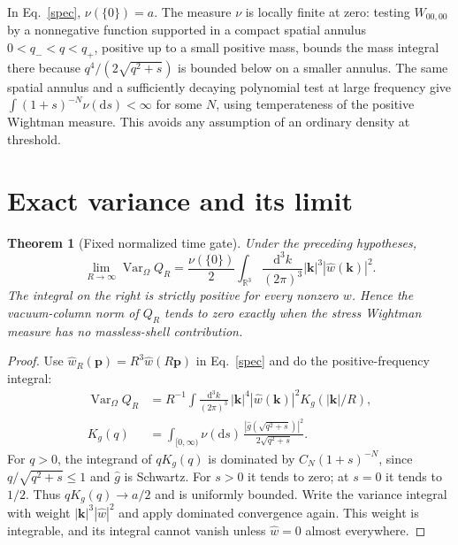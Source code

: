 \documentclass[11pt]{article}
\newtheorem{theorem}{Theorem}\newtheorem{lemma}[theorem]{Lemma}
\newcommand{\dd}{\mathrm d}
\newcommand{\Var}{\operatorname{Var}}
\newcommand{\pn}{\boldsymbol p}
\newcommand{\kn}{\boldsymbol k}
\begin{document}
In Eq.~\eqref{spec}, \(\nu(\{0\})=a\). The measure \(\nu\) is locally finite at zero: testing \(W_{00,00}\) by a nonnegative function supported in a compact spatial annulus \(0<q_-<q<q_+\), positive up to a small positive mass, bounds the mass integral there because \(q^4/(2\sqrt{q^2+s})\) is bounded below on a smaller annulus. The same spatial annulus and a sufficiently decaying polynomial test at large frequency give \(\int (1+s)^{-N}\nu(\dd s)<\infty\) for some \(N\), using temperateness of the positive Wightman measure. This avoids any assumption of an ordinary density at threshold.

\section{Exact variance and its limit}
\begin{theorem}[Fixed normalized time gate]\label{thm}
Under the preceding hypotheses,
\begin{equation}
 \lim_{R\to\infty}\Var_\Omega Q_R
  =\frac{\nu(\{0\})}{2}\int_{\mathbb R^3}\frac{\dd^3k}{(2\pi)^3}
                           |\kn|^3|\widehat w(\kn)|^2.
 \label{limit}
\end{equation}
The integral on the right is strictly positive for every nonzero \(w\). Hence the vacuum-column norm of \(Q_R\) tends to zero exactly when the stress Wightman measure has no massless-shell contribution.
\end{theorem}
\begin{proof}
Use \(\widehat w_R(\pn)=R^3\widehat w(R\pn)\) in Eq.~\eqref{spec} and do the positive-frequency integral:
\begin{align}
 \Var_\Omega Q_R
 &=R^{-1}\int\frac{\dd^3k}{(2\pi)^3}\,
       |\kn|^4|\widehat w(\kn)|^2 K_g(|\kn|/R),\\
 K_g(q)&=\int_{[0,\infty)}\nu(\dd s)\,
       \frac{|\widehat g(\sqrt{q^2+s})|^2}{2\sqrt{q^2+s}}.
 \label{Kg}
\end{align}
For \(q>0\), the integrand of \(qK_g(q)\) is dominated by \(C_N(1+s)^{-N}\), since \(q/\sqrt{q^2+s}\le1\) and \(\widehat g\) is Schwartz. For \(s>0\) it tends to zero; at \(s=0\) it tends to \(1/2\). Thus \(qK_g(q)\to a/2\) and is uniformly bounded. Write the variance integral with weight \(|\kn|^3|\widehat w|^2\) and apply dominated convergence again. This weight is integrable, and its integral cannot vanish unless \(\widehat w=0\) almost everywhere.
\end{proof}
\end{document}

